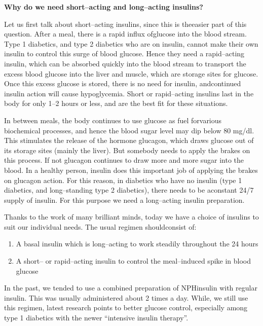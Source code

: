 \noindent\textbf{Why do we need short–acting and long–acting insulins?}

Let us first talk about short–acting insulins, since this is the\break easier part of this question. After a meal, there is a rapid influx of\break glucose into the blood stream. Type 1 diabetics, and type 2 diabetics who are on insulin, cannot make their own insulin to control this surge of blood glucose. Hence they need a rapid–acting insulin, which can be absorbed quickly into the blood stream to transport the excess blood glucose into the liver and muscle, which are storage sites for glucose. Once this excess glucose is stored, there is no need for insulin, and\break continued insulin action will cause hypoglycemia. Short or rapid–\break acting insulins last in the body for only 1–2 hours or less, and are the best fit for these situations.

In between meals, the body continues to use glucose as fuel for\break various biochemical processes, and hence the blood sugar level may dip below 80 mg/dl. This stimulates the release of the hormone gluca\-gon, which draws glucose out of its storage sites (mainly the liver). But somebody needs to apply the brakes on this process. If not glucagon continues to draw more and more sugar into the blood. In a healthy person, insulin does this important job of applying the brakes on gluca\-gon action. For this reason, in diabetics who have no insulin (type 1 diabetics, and long–standing type 2 diabetics), there needs to be a\break constant 24/7 supply of insulin. For this purpose we need a long–acting insulin preparation.


Thanks to the work of many brilliant minds, today we have a choice of insulins to suit our individual needs. The usual regimen should\break consist of:
\begin{enumerate}[•]
\itemsep=0pt
\item A basal insulin which is long–acting to work steadily throughout the 24 hours
\item A short– or rapid–acting insulin to control the meal–induced spike in blood glucose
\end{enumerate}

In the past, we tended to use a combined preparation of NPH\break insulin with regular insulin. This was usually administered about 2 times a day. While, we still use this regimen, latest research points to better glucose control, especially among type 1 diabetics with the newer “intensive insulin therapy”.

